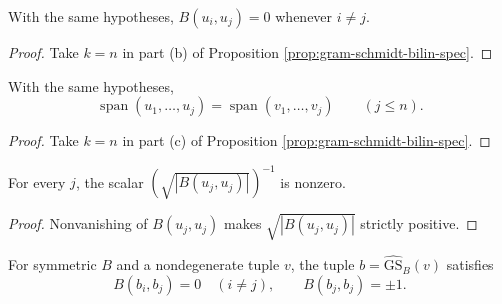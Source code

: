 \begin{lemma}
\label{lem:gram-schmidt-bilin-orthogonal}





With the same hypotheses, $B(u_i,u_j)=0$ whenever $i\ne j$.
\end{lemma}

\begin{proof}

\sketch Take $k=n$ in part (b) of Proposition
\ref{prop:gram-schmidt-bilin-spec}.
\end{proof}

\begin{lemma}
\label{lem:gram-schmidt-bilin-flag}





With the same hypotheses,
\[
\operatorname{span}(u_1,\ldots,u_j)=\operatorname{span}(v_1,\ldots,v_j)
\qquad(j\leq n).
\]
\end{lemma}

\begin{proof}

\sketch Take $k=n$ in part (c) of Proposition
\ref{prop:gram-schmidt-bilin-spec}.
\end{proof}

\begin{lemma}
\label{lem:gram-schmidt-bilin-normalizer-ne-zero}





For every $j$, the scalar $(\sqrt{|B(u_j,u_j)|})^{-1}$ is nonzero.
\end{lemma}

\begin{proof}

\sketch Nonvanishing of $B(u_j,u_j)$ makes $\sqrt{|B(u_j,u_j)|}$ strictly
positive.
\end{proof}

\begin{proposition}
\label{prop:gram-schmidt-bilin-orthonormal}





For symmetric $B$ and a nondegenerate tuple $v$, the tuple
$b=\widehat{\mathrm{GS}}_B(v)$ satisfies
\[
B(b_i,b_j)=0\quad(i\ne j),
\qquad B(b_j,b_j)=\pm1.
\]
\end{proposition}

